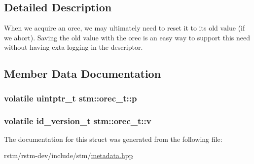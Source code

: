 \subsection{Detailed Description}
When we acquire an orec, we may ultimately need to reset it to its old value (if we abort). Saving the old value with the orec is an easy way to support this need without having exta logging in the descriptor. 

\subsection{Member Data Documentation}
\hypertarget{structstm_1_1orec__t_a78fd1223b5c4b0d1ec0ae06da1ff2453}{
\subsubsection[{p}]{\setlength{\rightskip}{0pt plus 5cm}volatile uintptr\-\_\-t stm\-::orec\-\_\-t\-::p}}\label{structstm_1_1orec__t_a78fd1223b5c4b0d1ec0ae06da1ff2453}
\hypertarget{structstm_1_1orec__t_a51e0b43d140f014b61f0d7445603b499}{
\subsubsection[{v}]{\setlength{\rightskip}{0pt plus 5cm}volatile {\bf id\-\_\-version\-\_\-t} stm\-::orec\-\_\-t\-::v}}\label{structstm_1_1orec__t_a51e0b43d140f014b61f0d7445603b499}


The documentation for this struct was generated from the following file\-:\begin{DoxyCompactItemize}
\item 
rstm/rstm-\/dev/include/stm/\hyperlink{metadata_8hpp}{metadata.\-hpp}\end{DoxyCompactItemize}
